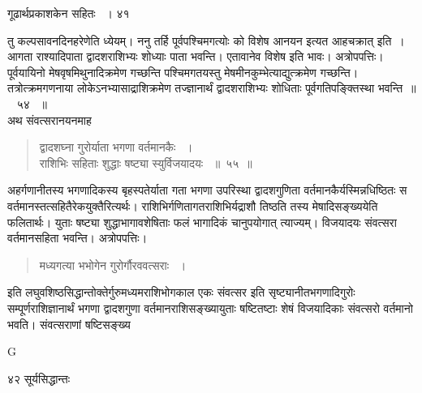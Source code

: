 \documentclass[11pt, openany]{book}
\begin{document}
\newpage

\hspace{3cm} गूढार्थप्रकाशकेन सहितः ~। \hfill ४१
\vspace{1cm}

\begin{sloppypar}
तु कल्पसावनदिनहरेणेति ध्येयम्। ननु तर्हि पूर्वपश्चिमगत्योः को विशेष आनयन इत्यत आह\textendash चक्रात् इति~। आगता राश्यादिपाता द्वादशराशिभ्यः शोध्याः पाता भवन्ति। एतावानेव विशेष इति भावः।  अत्रोपपत्तिः। पूर्वयायिनो मेषवृषमिथुनादिक्रमेण गच्छन्ति पश्चिमगतयस्तु मेषमीनकुम्भेत्याद्युत्क्रमेण गच्छन्ति। तत्रोत्क्रमगणनाया लोकेऽनभ्यासाद्राशिक्रमेण तज्ज्ञानार्थं द्वादशराशिभ्यः शोधिताः पूर्वगतिपङ्क्तिस्था भवन्ति~॥~ ५४~ ॥\\ 
\noindent अथ संवत्सरानयनमाह\textendash
\end{sloppypar}
\begin{quote}

 {\ssi द्वादशघ्ना गुरोर्याता भगणा वर्तमानकैः ~।\\
राशिभिः सहिताः शुद्धाः षष्ट्या स्युर्विजयादयः ~॥~५५~॥}
\end{quote}
\begin{sloppypar}
 अहर्गणानीतस्य भगणादिकस्य बृहस्पतेर्याता गता भगणा उपरिस्था द्वादशगुणिता वर्तमानकैर्यस्मिन्नधिष्ठितः स वर्तमानस्तत्सहितैरेकयुक्तैरित्यर्थः। राशिभिर्गणितागतराशिभिर्यद्राशौ तिष्ठति तस्य मेषादिसङ्ख्ययेति फलितार्थः। युताः षष्ट्या शुद्धाभागावशेषिताः फलं भागादिकं चानुपयोगात् त्याज्यम्। विजयादयः संवत्सरा वर्तमानसहिता भवन्ति। अत्रोपपत्तिः।
\end{sloppypar}
\begin{quote}

  {\ssi मध्यगत्या भभोगेन गुरोर्गौरववत्सराः ~।}
\end{quote}
\begin{sloppypar}
 इति लघुवशिष्ठसिद्धान्तोक्तेर्गुरुमध्यमराशिभोगकाल एकः संवत्सर इति सृष्ट्यानीतभगणादिगुरोः सम्पूर्णराशिज्ञानार्थं भगणा द्वादशगुणा वर्तमानराशिसङ्ख्यायुताः षष्टितष्टाः शेषं विजयादिकाः संवत्सरो वर्तमानो भवति। संवत्सराणां षष्टिसङ्ख्य\textendash
\end{sloppypar}

{\tiny{G}}

\newpage

\noindent ४२ \hspace{4cm} सूर्यसिद्धान्तः 
\vspace{1cm}
\end{document}
